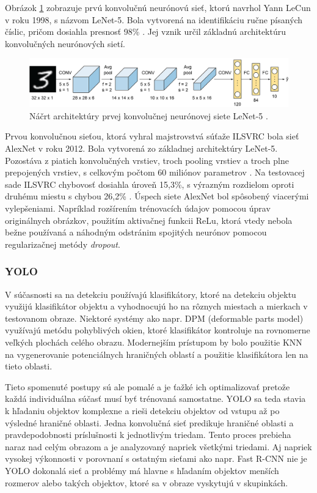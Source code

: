 Obrázok \ref{img:lenet} zobrazuje prvú konvolučnú neurónovú sieť, ktorú navrhol Yann LeCun v roku 1998, s názvom LeNet-5. Bola vytvorená na identifikáciu ručne písaných číslic, pričom dosiahla presnosť 98\% \cite{lenet}. Jej vznik určil základnú architektúru konvolučných neurónových sietí.

\begin{figure}[ht]
    \centering
    \includegraphics[width=1\textwidth]{images/02/lenet5.png}
    \caption{Náčrt architektúry prvej konvolučnej neurónovej siete LeNet-5 \cite{lenet}.}
    \label{img:lenet}
\end{figure}

Prvou konvolučnou sieťou, ktorá vyhral majstrovstvá súťaže ILSVRC bola sieť AlexNet v roku 2012. Bola vytvorená zo základnej architektúry LeNet-5. Pozostáva z piatich konvolučných vrstiev, troch pooling vrstiev a troch plne prepojených vrstiev, s celkovým počtom 60 miliónov parametrov \cite{AlexNet}. Na testovacej sade ILSVRC chybovosť dosiahla úroveň 15,3\%, s výrazným rozdielom oproti druhému miestu s chybou 26,2\% \cite{ilsvrc}. Úspech siete AlexNet bol spôsobený viacerými vylepšeniami. Napríklad rozšírením trénovacích údajov pomocou úprav originálnych obrázkov, použitím aktivačnej funkcii ReLu, ktorá vtedy nebola bežne používaná a náhodným odstránim spojitých neurónov pomocou regularizačnej metódy \textit{dropout}.

\subsubsection{YOLO}

V súčasnosti sa na detekciu používajú klasifikátory, ktoré na detekciu objektu využijú klasifikátor objektu a vyhodnocujú ho na rôznych miestach a mierkach v testovanom obraze. Niektoré systémy ako napr. DPM (deformable parts model) využívajú metódu pohyblivých okien, ktoré klasifikátor kontroluje na rovnomerne veľkých plochách celého obrazu.
Modernejším prístupom by bolo použitie KNN na vygenerovanie potenciálnych hraničných oblastí a použitie klasifikátora len na tieto oblasti.

Tieto spomenuté postupy sú ale pomalé a je ťažké ich optimalizovať pretože každá individuálna súčasť musí byť trénovaná samostatne. YOLO sa teda stavia k hľadaniu objektov komplexne a rieši detekciu objektov od vstupu až po výsledné hraničné oblasti. Jedna konvolučná sieť predikuje hraničné oblasti a pravdepodobnosti príslušnosti k jednotlivým triedam. Tento proces prebieha naraz nad celým obrazom a je analyzovaný napriek všetkými triedami. Aj napriek vysokej výkonnosti v porovnaní s ostatným sieťami ako napr. Fast R-CNN nie je YOLO dokonalá sieť a problémy má hlavne s hľadaním objektov menších rozmerov alebo takých objektov, ktoré sa v obraze vyskytujú v skupinkách.

